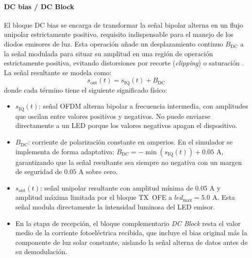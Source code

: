 \paragraph{DC bias / DC Block}
El bloque DC bias se encarga de transformar la señal bipolar alterna en un flujo unipolar estrictamente positivo, requisito indispensable para el manejo de los diodos emisores de luz. Esta operación añade un desplazamiento continuo $B_{\text{DC}}$ a la señal modulada para situar su amplitud en una región de operación estrictamente positiva, evitando distorsiones por recorte (\textit{clipping}) o saturación \cite{ghassemlooy2019optical, islim2017modulation}. La señal resultante se modela como:
\begin{equation}
	s_{\text{out}}(t) = s_{\text{IQ}}(t) + B_{\text{DC}}
	\label{eq:dc_bias}
\end{equation}
donde cada término tiene el siguiente significado físico:
\begin{itemize}
\item $s_{\text{IQ}}(t)$: señal OFDM alterna bipolar a frecuencia intermedia, con amplitudes que oscilan entre valores positivos y negativos. No puede enviarse directamente a un LED porque los valores negativos apagan el dispositivo.
\item $B_{\text{DC}}$: corriente de polarización constante en amperios. En el simulador se implementa de forma adaptativa: $B_{\text{DC}} = -\min(s_{\text{IQ}}(t)) + 0.05\text{ A}$, garantizando que la señal resultante sea siempre no negativa con un margen de seguridad de $0.05\text{ A}$ sobre cero.
\item $s_{\text{out}}(t)$: señal unipolar resultante con amplitud mínima de $0.05\text{ A}$ y amplitud máxima limitada por el bloque TX~OFE a $led_{\text{max}} = 5.0\text{ A}$. Esta señal modula directamente la intensidad luminosa del LED emisor.
\item En la etapa de recepción, el bloque complementario \textit{DC Block} resta el valor medio de la corriente fotoeléctrica recibida, que incluye el bias original más la componente de luz solar constante, aislando la señal alterna de datos antes de su demodulación.
\end{itemize}

